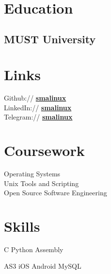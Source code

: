\documentclass[]{deedy-resume-openfont}
\begin{document}
\begin{minipage}[t]{0.33\textwidth}

\section{Education}

\subsection{MUST University}
\sectionsep

\section{Links}

Github://  \href{https://github.com/smalinux}{\bf smalinux} \\
LinkedIn://  \href{https://www.linkedin.com/in/smalinux/}{\bf smalinux} \\
Telegram://  \href{https://t.me/smalinux}{\bf smalinux} \\
\sectionsep


\section{Coursework}

Operating Systems \\
Unix Tools and Scripting \\
Open Source Software Engineering \\
\sectionsep

\section{Skills}

C \textbullet{}
Python \textbullet{}
Assembly \\
\sectionsep

AS3 \textbullet{} iOS \textbullet{} Android \textbullet{} MySQL
\sectionsep




%
%

\end{minipage}
\end{document}
